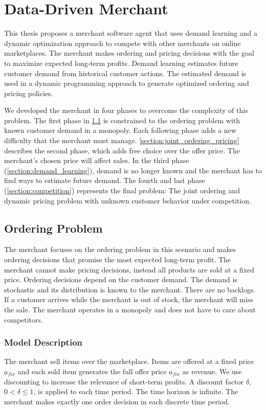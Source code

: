 
\chapter{Data-Driven Merchant}
This thesis proposes a merchant software agent that uses demand learning and a dynamic optimization approach to compete with other merchants on online marketplaces.
The merchant makes ordering and pricing decisions with the goal to maximize expected long-term profits.
Demand learning estimates future customer demand from historical customer actions.
The estimated demand is used in a dynamic programming approach to generate optimized ordering and pricing policies.

We developed the merchant in four phases to overcome the complexity of this problem.
The first phase in \cref{section:ordering} is constrained to the ordering problem with known customer demand in a monopoly.
Each following phase adds a new difficulty that the merchant must manage.
\cref{section:joint_ordering_pricing} describes the second phase, which adds free choice over the offer price.
The merchant's chosen price will affect sales.
In the third phase (\cref{section:demand_learning}), demand is no longer known and the merchant has to find ways to estimate future demand.
The fourth and last phase (\cref{section:competition}) represents the final problem: The joint ordering and dynamic pricing problem with unknown customer behavior under competition.

\section{Ordering Problem}
\label{section:ordering}
The merchant focuses on the ordering problem in this scenario and makes ordering decisions that promise the most expected long-term profit.
The merchant cannot make pricing decisions, instead all products are sold at a fixed price.
Ordering decisions depend on the customer demand.
The demand is stochastic and its distribution is known to the merchant.
There are no backlogs.
If a customer arrives while the merchant is out of stock, the merchant will miss the sale.
The merchant operates in a monopoly and does not have to care about competitors.

\subsection{Model Description}
\label{subs:ordering_model}
The merchant sell items over the marketplace.
Items are offered at a fixed price $a_{fix}$ and each sold item generates the full offer price $a_{fix}$ as revenue.
We use discounting to increase the relevance of short-term profits.
A discount factor $\delta$, $0 < \delta \leq 1$, is applied to each time period.
The time horizon is infinite.
The merchant makes exactly one order decision in each discrete time period.

